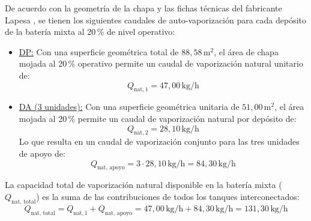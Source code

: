 \documentclass[12pt]{article}
\begin{document}
        De acuerdo con la geometría de la chapa y las fichas técnicas del fabricante Lapesa \cite{lapesa}, se tienen los siguientes caudales de auto-vaporización para cada depósito de la batería mixta al 20\,\% de nivel operativo:
        \begin{itemize}
            \item \underline{DP:}
            Con una superficie geométrica total de $88,58\,\text{m}^2$, el área de chapa mojada al 20\,\% operativo permite un caudal de vaporización natural unitario de:
            \begin{equation}
                Q_{\text{nat}, 1} = 47,00\,\text{kg/h}
            \end{equation}
            \item \underline{DA (3 unidades):}
            Con una superficie geométrica unitaria de $51,00\,\text{m}^2$, el área mojada al 20\,\% permite un caudal de vaporización natural por depósito de:
            \begin{equation}
                Q_{\text{nat}, 2} = 28,10\,\text{kg/h}
            \end{equation}
            Lo que resulta en un caudal de vaporización conjunto para las tres unidades de apoyo de:
            \begin{equation}
                Q_{\text{nat, apoyo}} = 3 \cdot 28,10\,\text{kg/h} = 84,30\,\text{kg/h}
            \end{equation}
        \end{itemize}

        La capacidad total de vaporización natural disponible en la batería mixta ($Q_{\text{nat, total}}$) es la suma de las contribuciones de todos los tanques interconectados:
        \begin{equation}
            Q_{\text{nat, total}} = Q_{\text{nat}, 1} + Q_{\text{nat, apoyo}} = 47,00\,\text{kg/h} + 84,30\,\text{kg/h} = 131,30\,\text{kg/h}
        \end{equation}
\end{document}
